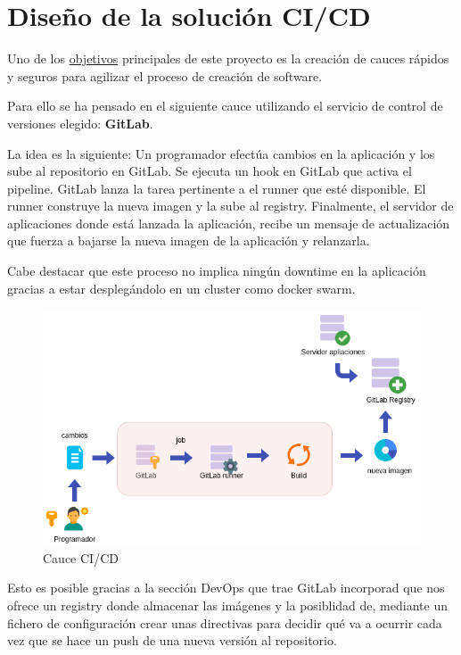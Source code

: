 \section{Diseño de la solución CI/CD}
\begin{text}
	Uno de los \hyperref[objetivos_primarios]{objetivos} principales de este proyecto es la creación de cauces rápidos y seguros para agilizar el proceso de creación de software.
	
	Para ello se ha pensado en el siguiente cauce utilizando el servicio de control de versiones elegido: \textbf{GitLab}.
	
	La idea es la siguiente:
		Un programador efectúa cambios en la aplicación y los sube al repositorio en GitLab. Se ejecuta un hook en GitLab que activa el pipeline. GitLab lanza la tarea pertinente a el runner que esté disponible. El runner construye la nueva imagen y la sube al registry. Finalmente, el servidor de aplicaciones donde está lanzada la aplicación, recibe un mensaje de actualización que fuerza a bajarse la nueva imagen de la aplicación y relanzarla.
	
	Cabe destacar que este proceso no implica ningún downtime en la aplicación gracias a estar desplegándolo en un cluster como docker swarm.
	\clearpage
	\begin{figure}[!hbt]
		\label{cauce_cicd}
		\centering
		\includegraphics[scale=0.55]{imagenes/Diseno/diagrama-cicd.png}
		\caption[Cauce CI/CD]{Cauce CI/CD}
	\end{figure}
	
	Esto es posible gracias a la sección DevOps que trae GitLab incorporad que nos ofrece un registry donde almacenar las imágenes y la posiblidad de, mediante un fichero de configuración crear unas directivas para decidir qué va a ocurrir cada vez que se hace un push de una nueva versión al repositorio.
\end{text}

